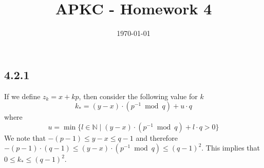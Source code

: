 \documentclass[12pt,a4paper]{article}
\title{APKC - Homework 4}
\date{\today}
\begin{document}
\maketitle
\subsection*{4.2.1}
If we define $z_k = x + kp$, then consider the following value for $k$
\[
    k_* = (y-x) \cdot (p^{-1} \bmod q) + u \cdot q 
\]
where 
\[
    u = \min\{ l\in\mathbb{N} \mid (y-x) \cdot (p^{-1} \bmod q) + l \cdot q > 0 \}
\]
We note that $-(p-1) \leq y-x \leq q-1$ and therefore  $-(p-1)\cdot(q-1) \leq (y-x) \cdot (p^{-1} \bmod q) \leq (q-1)^2$.
This implies that $0 \leq k_* \leq (q-1)^2$.
\end{document}
